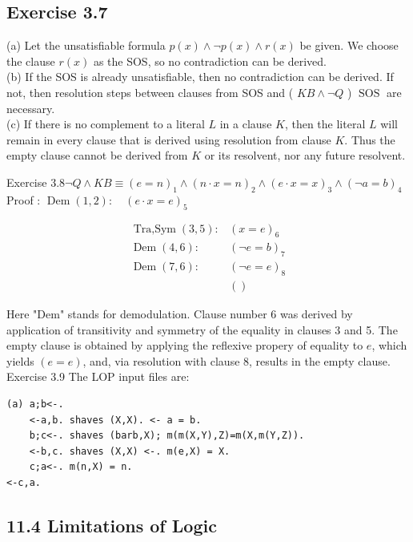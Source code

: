\documentclass[10pt]{book}
\begin{document}
\begin{center}
\begin{enumerate}
\begin{center}
\begin{center}
\begin{center}
\begin{center}
\begin{center}
\section*{Exercise 3.7}
(a) Let the unsatisfiable formula $p(x) \wedge \neg p(x) \wedge r(x)$ be given. We choose the clause $r(x)$ as the SOS, so no contradiction can be derived.\\
(b) If the SOS is already unsatisfiable, then no contradiction can be derived. If not, then resolution steps between clauses from SOS and ( $K B \wedge \neg Q$ ) $\operatorname{SOS}$ are necessary.\\
(c) If there is no complement to a literal $L$ in a clause $K$, then the literal $L$ will remain in every clause that is derived using resolution from clause $K$. Thus the empty clause cannot be derived from $K$ or its resolvent, nor any future resolvent.


Exercise $3.8 \neg Q \wedge K B \equiv(e=n)_{1} \wedge(n \cdot x=n)_{2} \wedge(e \cdot x=x)_{3} \wedge(\neg a=b)_{4}$\\
Proof : $\operatorname{Dem}(1,2): \quad(e \cdot x=e)_{5}$

$$
\begin{array}{ll}
\operatorname{Tra,Sym}(3,5): & (x=e)_{6} \\
\operatorname{Dem}(4,6): & (\neg e=b)_{7} \\
\operatorname{Dem}(7,6): & (\neg e=e)_{8} \\
& ()
\end{array}
$$

Here "Dem" stands for demodulation. Clause number 6 was derived by application of transitivity and symmetry of the equality in clauses 3 and 5. The empty clause is obtained by applying the reflexive propery of equality to $e$, which yields $(e=e)$, and, via resolution with clause 8, results in the empty clause.\\
Exercise 3.9 The LOP input files are:

\begin{verbatim}
(a) a;b<-.
    <-a,b. shaves (X,X). <- a = b.
    b;c<-. shaves (barb,X); m(m(X,Y),Z)=m(X,m(Y,Z)).
    <-b,c. shaves (X,X) <-. m(e,X) = X.
    c;a<-. m(n,X) = n.
<-c,a.
\end{verbatim}

\subsection*{11.4 Limitations of Logic}

\end{center}
\end{center}
\end{center}
\end{center}
\end{center}
\end{enumerate}
\end{center}
\end{document}
